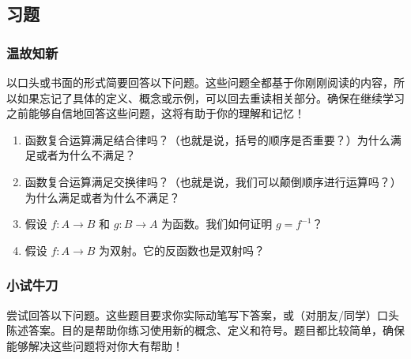 
\subsection{习题}\label{sec:section7.5.4}

\subsubsection*{温故知新}

以口头或书面的形式简要回答以下问题。这些问题全都基于你刚刚阅读的内容，所以如果忘记了具体的定义、概念或示例，可以回去重读相关部分。确保在继续学习之前能够自信地回答这些问题，这将有助于你的理解和记忆！

\begin{enumerate}[label=(\arabic*)]
    \item 函数复合运算满足结合律吗？（也就是说，括号的顺序是否重要？）为什么满足或者为什么不满足？
    \item 函数复合运算满足交换律吗？（也就是说，我们可以颠倒顺序进行运算吗？）为什么满足或者为什么不满足？
    \item 假设 $f : A \to B$ 和 $g : B \to A$ 为函数。我们如何证明 $g = f^{-1}$？
    \item 假设 $f : A \to B$ 为双射。它的反函数也是双射吗？
\end{enumerate}

\subsubsection*{小试牛刀}

尝试回答以下问题。这些题目要求你实际动笔写下答案，或（对朋友/同学）口头陈述答案。目的是帮助你练习使用新的概念、定义和符号。题目都比较简单，确保能够解决这些问题将对你大有帮助！

